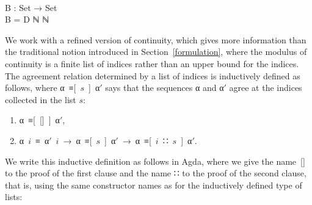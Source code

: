 \documentclass{entcs} \usepackage{prentcsmacro}
\newcommand{\AgdaC}[1]{\mbox{#1}}
\newcommand{\AgdaFontStyle}[1]{\textsf{#1}}
\newcommand{\AgdaSymbol}      [1]{\textcolor{AgdaSymbol}{#1}}
\newcommand{\AgdaPrimitiveType}[1]
    {\AgdaFontStyle{\textcolor{AgdaPrimitiveType}{#1}}}
\newcommand{\AgdaDatatype} [1]{\AgdaFontStyle{\textcolor{AgdaDatatype}{#1}}}
\newcommand{\AgdaFunction} [1]{\AgdaFontStyle{\textcolor{AgdaFunction}{#1}}}
\newcommand{\AgdaCodeStyle}{\small}
\newenvironment{code}%
{\noindent\AgdaCodeStyle\pboxed}%
{\endpboxed\par\noindent%
\ignorespacesafterend}
\begin{document}
\begin{code}\>\<%
\\
\>\AgdaFunction{B} \AgdaSymbol{:} \AgdaPrimitiveType{Set} \AgdaSymbol{→} \AgdaPrimitiveType{Set}\<%
\\
\>\AgdaFunction{B} \AgdaSymbol{=} \AgdaDatatype{D} \AgdaDatatype{ℕ} \AgdaDatatype{ℕ}\<%
\\
\>\<\end{code}
We work with a refined version of continuity, which gives more
information than the traditional notion introduced in
Section~\ref{formulation}, where the modulus of continuity is a finite
list of indices rather than an upper bound for the indices. The
agreement relation determined by a list of indices is inductively
defined as follows, where \AgdaC{\AgdaC{α ≡[ $s$ ] α$'$}} says that
the sequences \AgdaC{α} and \AgdaC{α$'$} agree at the indices
collected in the list \AgdaC{$s$}:

\begin{enumerate}
\item \AgdaC{α ≡[ [] ] α$'$},
\item \AgdaC{α $i$ ≡ α$'$ $i$ → α ≡[ $s$ ] α$'$ → α ≡[ $i$ ∷ $s$ ] α$'$}.
\end{enumerate}
We write this inductive definition as follows in Agda, where we give
the name~[] to the proof of the first clause and the name ∷ to the
proof of the second clause, that is, using the same constructor names
as for the inductively defined type of lists:
\end{document}
